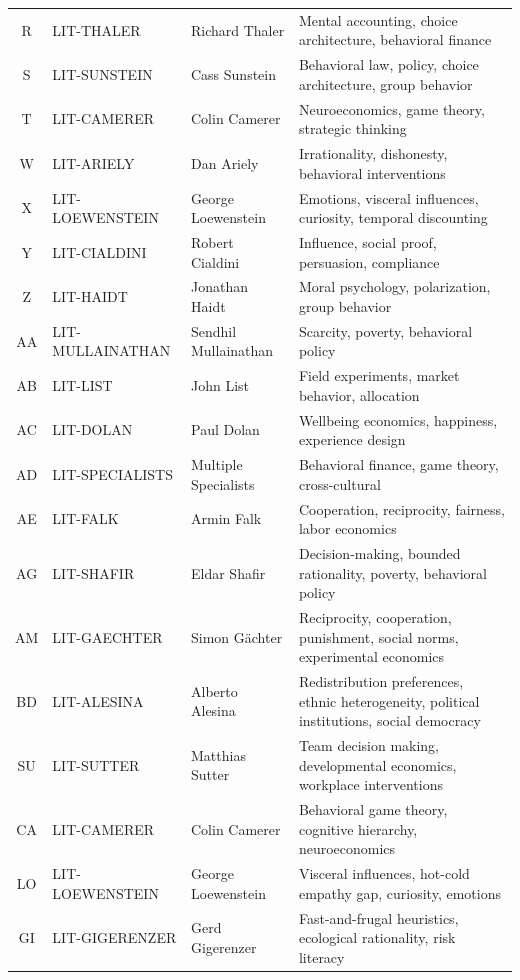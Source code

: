 \begin{table}[htbp]
\begin{tabular}{@{}cllp{5cm}@{}}
R & LIT-THALER & Richard Thaler & Mental accounting, choice architecture, behavioral finance \\
S & LIT-SUNSTEIN & Cass Sunstein & Behavioral law, policy, choice architecture, group behavior \\
T & LIT-CAMERER & Colin Camerer & Neuroeconomics, game theory, strategic thinking \\
W & LIT-ARIELY & Dan Ariely & Irrationality, dishonesty, behavioral interventions \\
X & LIT-LOEWENSTEIN & George Loewenstein & Emotions, visceral influences, curiosity, temporal discounting \\
Y & LIT-CIALDINI & Robert Cialdini & Influence, social proof, persuasion, compliance \\
Z & LIT-HAIDT & Jonathan Haidt & Moral psychology, polarization, group behavior \\
AA & LIT-MULLAINATHAN & Sendhil Mullainathan & Scarcity, poverty, behavioral policy \\
AB & LIT-LIST & John List & Field experiments, market behavior, allocation \\
AC & LIT-DOLAN & Paul Dolan & Wellbeing economics, happiness, experience design \\
AD & LIT-SPECIALISTS & Multiple Specialists & Behavioral finance, game theory, cross-cultural \\
AE & LIT-FALK & Armin Falk & Cooperation, reciprocity, fairness, labor economics \\
AG & LIT-SHAFIR & Eldar Shafir & Decision-making, bounded rationality, poverty, behavioral policy \\
AM & LIT-GAECHTER & Simon Gächter & Reciprocity, cooperation, punishment, social norms, experimental economics \\
BD & LIT-ALESINA & Alberto Alesina & Redistribution preferences, ethnic heterogeneity, political institutions, social democracy \\
SU & LIT-SUTTER & Matthias Sutter & Team decision making, developmental economics, workplace interventions \\
CA & LIT-CAMERER & Colin Camerer & Behavioral game theory, cognitive hierarchy, neuroeconomics \\
LO & LIT-LOEWENSTEIN & George Loewenstein & Visceral influences, hot-cold empathy gap, curiosity, emotions \\
GI & LIT-GIGERENZER & Gerd Gigerenzer & Fast-and-frugal heuristics, ecological rationality, risk literacy \\

\end{tabular}
\end{table}
